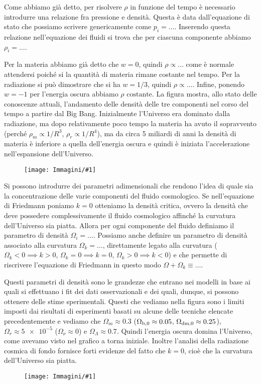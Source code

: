 \documentclass[12pt,a4paper,fleqn,draft]{article}
\newcommand{\figura}[1]{
  \begin{figure}[h!]
    \texttt{[image: Immagini/\#1]}
  \end{figure}
}
\begin{document}
Come abbiamo già detto, per risolvere $\rho$ in funzione del tempo è necessario
introdurre una relazione fra pressione e densità. Questa è data dall'equazione
di stato che possiamo scrivere genericamente come $p_i = \dots$.  Inserendo
questa relazione nell'equazione dei fluidi si trova che per ciascuna componente
abbiamo $\rho_i = \dots$.

Per la materia abbiamo già detto che $w = 0$, quindi $\rho \propto \dots$ come è
normale attendersi poiché si la quantità di materia rimane costante nel
tempo. Per la radiazione si può dimostrare che si ha $w = 1/3$, quindi
$\rho \propto \dots$. Infine, ponendo $w=-1$ per l'energia oscura abbiamo
$\rho \text{ costante}$. La figura mostra, allo stato delle conoscenze attuali,
l'andamento delle densità delle tre componenti nel corso del tempo a partire dal
Big Bang. Inizialmente l'Universo era dominato dalla radiazione, ma dopo
relativamente poco tempo la materia ha avuto il sopravvento (perché
$\rho_m \propto 1/R^3$, $\rho_r \propto 1/R^4$), ma da circa 5 miliardi di anni
la densità di materia è inferiore a quella dell'energia oscura e quindi è
iniziata l'accelerazione nell'espansione dell'Universo.
\figura{evoluzione_densita}

Si possono introdurre dei parametri adimensionali che rendono l'idea di quale
sia la concentrazione delle varie componenti del fluido cosmologico. Se
nell'equazione di Friedmann poniamo $k=0$ otteniamo la densità critica, ovvero
la densità che deve possedere complessivamente il fluido cosmologico affinché la
curvatura dell'Universo sia piatta. Allora per ogni componente del fluido
definiamo il parametro di densità $\Omega_i = \dots$. Possiamo anche definire un
parametro di densità associato alla curvatura $\Omega_k = \dots$, direttamente
legato alla curvatura ($\Omega_k < 0 \implies k >0$, $\Omega_k = 0 \implies
k=0$, $\Omega_k > 0 \implies k<0$) e che permette di riscrivere l'equazione di
Friedmann in questo modo $\Omega + \Omega_k \equiv \dots$.

Questi parametri di densità sono le grandezze che entrano nei modelli in base ai
quali si effettuano i fit dei dati osservazionali e dei quali, dunque, si
possono ottenere delle stime sperimentali. Questi che vediamo nella figura sono
i limiti imposti dai risultati di esperimenti basati su alcune delle tecniche
elencate precedentemente e vediamo che $\Omega_m \approx \num{0.3}$
($\Omega_{\textup{b},0} \approx \num{0.05}$,
$\Omega_{\textup{dm},0} \approx \num{0.25}$), $\Omega_r \approx \num{5e-5}$
($\Omega_\nu \approx 0$) e $\Omega_\Lambda \approx \num{0.7}$. Quindi l'energia
oscura domina l'Universo, come avevamo visto nel grafico a torna
iniziale. Inoltre l'analisi della radiazione cosmica di fondo fornisce forti
evidenze del fatto che $k=0$, cioè che la curvatura dell'Universo sia piatta.
\figura{confcmbclust}
\end{document}
